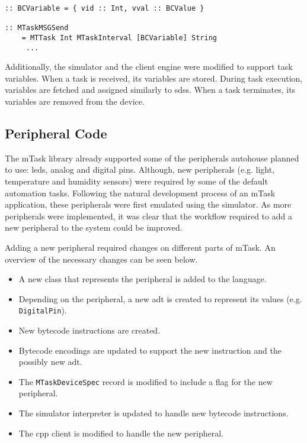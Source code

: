 \begin{lstlisting}[caption=Change in mTask's communication protocol to accommodate task variables,captionpos=b,label=vari_message]
:: BCVariable = { vid :: Int, vval :: BCValue }

:: MTaskMSGSend
	= MTTask Int MTaskInterval [BCVariable] String
	 ...
\end{lstlisting}

Additionally, the simulator and the client engine were modified to support task variables. When a task is received, its variables are stored. During task execution, variables are fetched and assigned similarly to \acp{sds}. When a task terminates, its variables are removed from the device.

\subsection{Peripheral Code}

The \gls{mTask} library already supported some of the peripherals \gls{autohouse} planned to use: \acsp{led}, analog and digital pins. Although, new peripherals (e.g. light, temperature and humidity sensors) were required by some of the default automation tasks. Following the natural development process of an \gls{mTask} application, these peripherals were first emulated using the simulator. As more peripherals were implemented, it was clear that the workflow required to add a new peripheral to the system could be improved.

Adding a new peripheral required changes on different parts of \gls{mTask}. An overview of the necessary changes can be seen below.

\begin{itemize}
    \item A new class that represents the peripheral is added to the language. 
    \item Depending on the peripheral, a new \ac{adt} is created to represent its values (e.g. \texttt{DigitalPin}).
    \item New bytecode instructions are created.
    \item Bytecode encodings are updated to support the new instruction and the possibly new \acs{adt}.
    \item The \texttt{MTaskDeviceSpec} record is modified to include a flag for the new peripheral.
    \item The simulator interpreter is updated to handle new bytecode instructions.
    \item The \gls{cpp} client is modified to handle the new peripheral.
\end{itemize}

